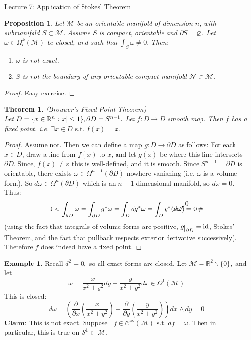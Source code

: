 \documentclass[10pt]{article}
\theoremstyle{plain}
\newtheorem{theorem}{Theorem}[section]
\newtheorem{prop}[thm]{Proposition}
\theoremstyle{definition}
\newtheorem{exmp}[thm]{Example} %
\newcommand{\st}{\text{ s.t. }}
\newcommand{\Claim}{\textbf{Claim: }}
\newcommand{\id}{\text{id}}
\newcommand{\Real}{\mathbb{R}}
\newcommand{\man}{\mathcal{M}}
\newcommand{\nan}{\mathcal{N}}
\newcommand{\pformman}[1]{\Omega^{#1}(\man)}
\newcommand{\compactpformman}[1]{\Omega^{#1}_c(\man)}
\newcommand{\dx}{dx}
\newcommand{\dy}{dy}
\newcommand{\deriv}{d}
\newcommand{\df}{df}
\newcommand{\dw}{d\omega}
\newcommand{\cts}[1]{\mathcal{C}^{\infty}(#1)}
\def\restrict#1{\raise-.5ex\hbox{\ensuremath|}_{#1}}
\begin{document}
\begin{section}{Lecture 7: Application of Stokes' Theorem}
\begin{prop}
Let $\man$ be an orientable manifold of dimension $n$, with submanifold $S\subset \man$. Assume $S$ is compact, orientable and $\partial S = \varnothing$. Let $\omega \in \compactpformman{k}$ be closed, and such that $\int_S \omega \neq 0.$ Then:
\begin{enumerate}
    \item $\omega$ is not exact.
    \item $S$ is not the boundary of any orientable compact manifold $\nan \subset \man$.
\end{enumerate}
\end{prop}\noindent
\begin{proof}
Easy exercise.
\end{proof}
\begin{theorem}
(Brouwer's Fixed Point Theorem) \\
Let $D = \{x\in\Real^n : \abs{x} \leq 1\},\partial D = S^{n-1}.$ Let $f : D \to D $ smooth map. Then $f$ has a fixed point,  i.e. $\exists x \in D \st f(x) = x.$
\end{theorem}
\begin{proof}
Assume not. Then we can define a map $g : D \to \partial D$ as follows: For each $x\in D$, draw a line from $f(x)$ to $x$, and let $g(x)$ be where this line intersects $\partial D$. Since, $f(x) \neq x$ this is well-defined, and it is smooth. Since $S^{n-1} = \partial D$ is orientable, there exists $\omega \in \Omega^{n-1}({\partial D})$ nowhere vanishing (i.e. $\omega$ is a volume form). So $\dw \in \Omega^n (\partial D)$ which is an $n-1$-dimensional manifold, so $\dw = 0.$ Thus:
$$0 < \int_{\partial D} \omega = \int_{\partial D} g^* \omega = \int _D \deriv g^* \omega = \int_D g^*(\cancelto{0}{\dw}) = 0 \,\#$$
(using the fact that integrals of volume forms are positive, $g \restrict{\partial D} = \id$, Stokes' Theorem, and the fact that pullback respects exterior derivative successively). Therefore $f$ does indeed have a fixed point.
\end{proof}
\begin{exmp}
Recall $\deriv ^2 = 0,$ so all exact forms are closed. Let $\man = \Real^2 \backslash \{0\}, $ and let 
$$\omega = \frac{x}{x^2+y^2} \dy - \frac{y}{x^2+y^2} \dx \in \pformman{1}$$
This is closed:
$$\dw = \left(\frac{\partial}{\partial x} \left(\frac{x}{x^2+y^2}\right) + \frac{\partial}{\partial y}\left( \frac{y}{x^2+y^2}\right)\right) \dx \wedge \dy = 0$$
$\Claim$This is not exact. Suppose $\exists f \in \cts{\man} \st \df = \omega. $ Then in particular, this is true on $S^1 \subset \man.$

\end{exmp}
\end{section}
\end{document}
